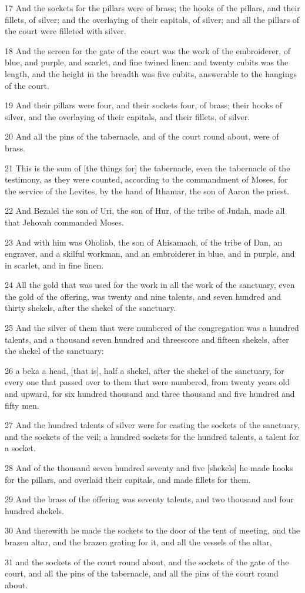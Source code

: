 \par 17 And the sockets for the pillars were of brass; the hooks of the pillars, and their fillets, of silver; and the overlaying of their capitals, of silver; and all the pillars of the court were filleted with silver.
\par 18 And the screen for the gate of the court was the work of the embroiderer, of blue, and purple, and scarlet, and fine twined linen: and twenty cubits was the length, and the height in the breadth was five cubits, answerable to the hangings of the court.
\par 19 And their pillars were four, and their sockets four, of brass; their hooks of silver, and the overlaying of their capitals, and their fillets, of silver.
\par 20 And all the pins of the tabernacle, and of the court round about, were of brass.
\par 21 This is the sum of [the things for] the tabernacle, even the tabernacle of the testimony, as they were counted, according to the commandment of Moses, for the service of the Levites, by the hand of Ithamar, the son of Aaron the priest.
\par 22 And Bezalel the son of Uri, the son of Hur, of the tribe of Judah, made all that Jehovah commanded Moses.
\par 23 And with him was Oholiab, the son of Ahisamach, of the tribe of Dan, an engraver, and a skilful workman, and an embroiderer in blue, and in purple, and in scarlet, and in fine linen.
\par 24 All the gold that was used for the work in all the work of the sanctuary, even the gold of the offering, was twenty and nine talents, and seven hundred and thirty shekels, after the shekel of the sanctuary.
\par 25 And the silver of them that were numbered of the congregation was a hundred talents, and a thousand seven hundred and threescore and fifteen shekels, after the shekel of the sanctuary:
\par 26 a beka a head, [that is], half a shekel, after the shekel of the sanctuary, for every one that passed over to them that were numbered, from twenty years old and upward, for six hundred thousand and three thousand and five hundred and fifty men.
\par 27 And the hundred talents of silver were for casting the sockets of the sanctuary, and the sockets of the veil; a hundred sockets for the hundred talents, a talent for a socket.
\par 28 And of the thousand seven hundred seventy and five [shekels] he made hooks for the pillars, and overlaid their capitals, and made fillets for them.
\par 29 And the brass of the offering was seventy talents, and two thousand and four hundred shekels.
\par 30 And therewith he made the sockets to the door of the tent of meeting, and the brazen altar, and the brazen grating for it, and all the vessels of the altar,
\par 31 and the sockets of the court round about, and the sockets of the gate of the court, and all the pins of the tabernacle, and all the pins of the court round about.

